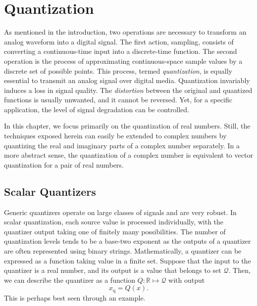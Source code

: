 \chapter{Quantization}

As mentioned in the introduction, two operations are necessary to transform an analog waveform into a digital signal.
The first action, sampling, consists of converting a continuous-time input into a discrete-time function.
The second operation is the process of approximating continuous-space sample values by a discrete set of possible points.
This process, termed \emph{quantization}, is equally essential to transmit an analog signal over digital media.
Quantization invariably induces a loss in signal quality.
The \emph{distortion} between the original and quantized functions is usually unwanted, and it cannot be reversed.
Yet, for a specific application, the level of signal degradation can be controlled.

In this chapter, we focus primarily on the quantization of real numbers.
Still, the techniques exposed herein can easily be extended to complex numbers by quantizing the real and imaginary parts of a complex number separately.
In a more abstract sense, the quantization of a complex number is equivalent to vector quantization for a pair of real numbers.


\section{Scalar Quantizers}

Generic quantizers operate on large classes of signals and are very robust.
In scalar quantization, each source value is processed individually, with the quantizer output taking one of finitely many possibilities.
The number of quantization levels tends to be a base-two exponent as the outputs of a quantizer are often represented using binary strings.
Mathematically, a quantizer can be expressed as a function taking value in a finite set.
Suppose that the input to the quantizer is a real number, and its output is a value that belongs to set $\mathcal{Q}$.
Then, we can describe the quantizer as a function $Q : \mathbb{R} \mapsto \mathcal{Q}$ with output
\begin{equation*}
x_{\mathrm{q}} = Q(x) .
\end{equation*}
This is perhaps best seen through an example.



